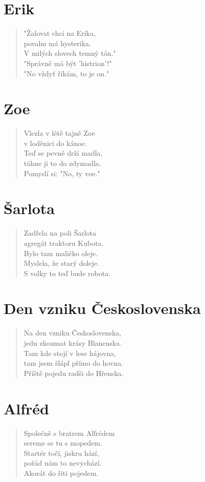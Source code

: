 \section*{Erik}
\begin{verse}
"Žalovat chci na Erika,\\
povahu má hysterika.\\
V milých slovech temný tón."\\
"Správně má být 'histrion'!"\\
"No vždyť říkám, to je on."
\end{verse}

\section*{Zoe}
\begin{verse}
Vlezla v létě tajně Zoe\\
v loděnici do kánoe.\\
Teď se pevně drží madla,\\
táhne ji to do zdymadla.\\
Pomyslí si: "No, ty voe."
\end{verse}

\section*{Šarlota}
\begin{verse}
Zadřela na poli Šarlota\\
agregát traktoru Kubota.\\
Bylo tam maličko oleje.\\
Myslela, že starý doleje.\\
S volky to teď bude robota.
\end{verse}

\section*{Den vzniku Československa}
\begin{verse}
Na den vzniku Československa,\\
jedu zkoumat krásy Blanenska.\\
Tam kde stojí v lese hájovna,\\
tam jsem šlápl přímo do hovna.\\
Příště pojedu radši do Hřenska.
\end{verse}

\section*{Alfréd}
\begin{verse}
Společně s bratrem Alfrédem\\
sereme se tu s mopedem.\\
Startér točí, jiskru hází,\\
pořád nám to nevychází.\\
Akorát do řiti pojedem.
\end{verse}


